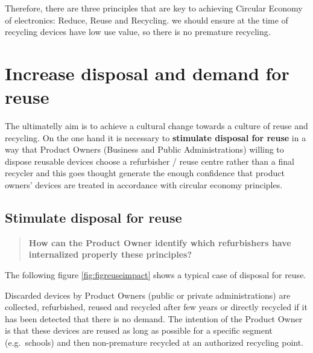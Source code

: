 \documentclass[
]{book}
\begin{document}
Therefore, there are three principles that are key to achieving Circular Economy of electronics: Reduce, Reuse and Recycling. we should ensure at the time of recycling devices have low use value, so there is no premature recycling.

\hypertarget{increase-disposal-and-demand-for-reuse}{%
\section{Increase disposal and demand for reuse}\label{increase-disposal-and-demand-for-reuse}}

The ultimatelly aim is to achieve a cultural change towards a culture of reuse and recycling. On the one hand it is necessary to \textbf{stimulate disposal for reuse} in a way that Product Owners (Business and Public Administrations) willing to dispose reusable devices choose a refurbisher / reuse centre rather than a final recycler and this goes thought generate the enough confidence that product owners' devices are treated in accordance with circular economy principles.

\hypertarget{stimulate-disposal-for-reuse}{%
\subsection{Stimulate disposal for reuse}\label{stimulate-disposal-for-reuse}}

\begin{quote}
\textbf{How can the Product Owner identify which refurbishers have internalized properly these principles?}
\end{quote}

The following figure \ref{fig:figreuseimpact} shows a typical case of disposal for reuse.

Discarded devices by Product Owners (public or private administrations) are collected, refurbished, reused and recycled after few years or directly recycled if it has been detected that there is no demand. The intention of the Product Owner is that these devices are reused as long as possible for a specific segment (e.g.~schools) and then non-premature recycled at an authorized recycling point.
\end{document}
